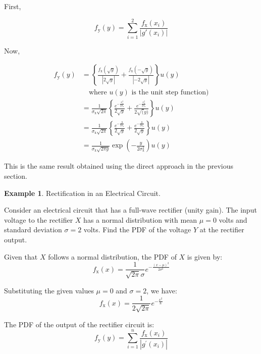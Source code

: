\documentclass[12pt]{book}
\theoremstyle{definition}
\newtheorem{exmp}{Example}[chapter]
\begin{document}
First,

\[
f_\mathrm{y}(y) = \sum_{i=1}^2 \frac{ f_\mathrm{x}(x_i)}{|g{'}(x_i)|}
\]

Now,

\[    \begin{split}
        f_\mathrm{y}(y)  & = \left \{ \frac{f_\mathrm{x}(\sqrt{y})}{|2 \sqrt{y}| }  + \frac{f_\mathrm{x}(-\sqrt{y})}{|- 2 \sqrt{y}| }  \right \} u(y)\\
                & \quad \text{where } u(y) \text{ is the unit step function)} \\
                & = \frac{1}{\sigma_\mathrm{x} \sqrt{2 \pi}} \left \{ \frac{e^{- \frac{x_1^2}{2 \sigma_\mathrm{x}}}}{2 \sqrt{y}}  + \frac{e^{- \frac{x_2^2}{2 \sigma_\mathrm{x}}}}{2\sqrt(y)} \right \}  u(y) \\
                & = \frac{1}{\sigma_\mathrm{x} \sqrt{2 \pi}} \left \{ \frac{e^{- \frac{y}{2 \sigma_\mathrm{x}}}}{2 \sqrt{y}}  + \frac{e^{- \frac{y}{2 \sigma_\mathrm{x}}}}{2\sqrt{y}} \right \}  u(y) \\
                & = \frac{1}{\sigma_\mathrm{x} \sqrt{2\pi y}} \exp \left ( - \frac{y}{2 \sigma^2_\mathrm{x}} \right) u(y)
\end{split}
\]

This is the same result obtained using the direct approach in the previous section.

\begin{tcolorbox}
    \begin{exmp}{Rectification in an Electrical Circuit.}

Consider an  electrical circuit that has a full-wave rectifier (unity gain). The input voltage to the rectifier \(X\) has a normal distribution with mean \(\mu = 0\) volts and standard deviation \(\sigma = 2\) volts.  Find the PDF of the voltage \(Y\) at the rectifier output.

    \end{exmp}
\end{tcolorbox}

Given that \(X\) follows a normal distribution, the PDF of \(X\) is given by:
\[ f_\mathrm{x}(x) = \frac{1}{\sqrt{2\pi }\sigma} e^{-\frac{(x-\mu)^2}{2\sigma^2}} \]

Substituting the given values \(\mu = 0\) and \(\sigma = 2\), we have:
\[ f_\mathrm{x}(x) = \frac{1}{2\sqrt{2\pi }} e^{-\frac{x^2}{8}} \]

The PDF of the output of the rectifier circuit is:
\[
f_\mathrm{y}(y) = \sum_{i=1}^n \frac{ f_\mathrm{x}(x_i)}{|g^{'}(x_i)|}
\]
\end{document}
